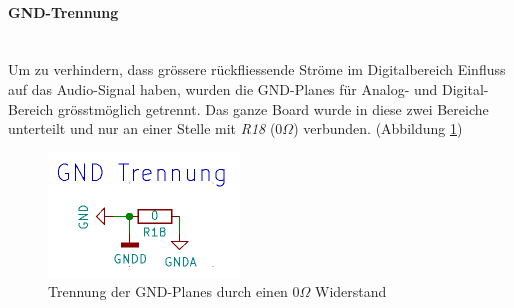 \paragraph{GND-Trennung}\vspace{-0.3cm}\\
\label{par:GND}
Um zu verhindern, dass grössere rückfliessende Ströme im Digitalbereich Einfluss auf das Audio-Signal haben, wurden die GND-Planes für Analog- und Digital-Bereich grösstmöglich getrennt. Das ganze Board wurde in diese zwei Bereiche unterteilt und nur an einer Stelle mit \textit{R18} ($0\Omega$) verbunden. (Abbildung \ref{fig:Schema_GND})

\begin{figure} [H]
\begin{center}
 \includegraphics[scale=0.6]{../graphics/Schema_GND.png} 
\caption{Trennung der GND-Planes durch einen $0\Omega$ Widerstand}
\label{fig:Schema_GND}
\end{center}
\end{figure}



 